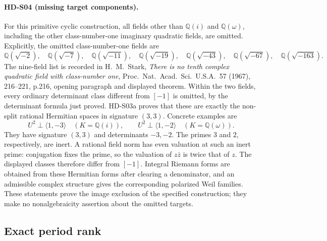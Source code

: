 \paragraph{HD-S04 (missing target components).}
For this primitive cyclic construction, all fields other than
\(\mathbb Q(i)\) and \(\mathbb Q(\omega)\), including the other
class-number-one imaginary quadratic fields, are omitted. Explicitly,
the omitted class-number-one fields are
\[
 \mathbb Q(\sqrt{-2}),\quad \mathbb Q(\sqrt{-7}),\quad
 \mathbb Q(\sqrt{-11}),\quad \mathbb Q(\sqrt{-19}),\quad
 \mathbb Q(\sqrt{-43}),\quad \mathbb Q(\sqrt{-67}),\quad
 \mathbb Q(\sqrt{-163}).
\]
The nine-field list is recorded in H.\ M.\ Stark,
\emph{There is no tenth complex quadratic field with class-number one},
Proc.\ Nat.\ Acad.\ Sci.\ U.S.A.\ 57 (1967), 216--221,
p.216, opening paragraph and displayed theorem.
Within the two fields, every ordinary determinant class different from
\([-1]\) is omitted, by the determinant formula just proved.
HD-S03a proves that these are exactly the non-split rational
Hermitian spaces in signature \((3,3)\).
Concrete examples are
\[
 U^2\perp\langle1,-3\rangle\quad(K=\mathbb Q(i)),\qquad
 U^2\perp\langle1,-2\rangle\quad(K=\mathbb Q(\omega)).
\]
They have signature \((3,3)\) and determinants \(-3,-2\).
The primes \(3\) and \(2\), respectively, are inert. A rational field norm
has even valuation at such an inert prime: conjugation fixes the prime,
so the valuation of \(z\bar z\) is twice that of \(z\).
The displayed classes therefore differ from \([-1]\).
Integral Riemann forms are obtained from these Hermitian forms after
clearing a denominator, and an admissible complex structure gives the
corresponding polarized Weil families.
These statements prove the image exclusion of the specified construction;
they make no nonalgebraicity assertion about the omitted targets.

\subsection{Exact period rank}

